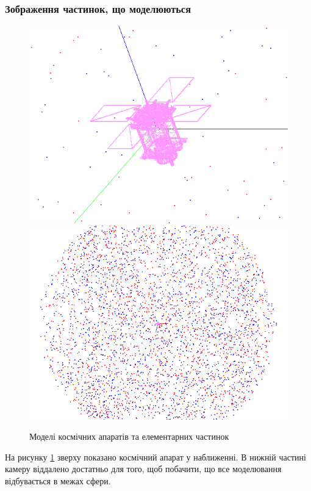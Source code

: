 \documentclass[a4paper,12pt]{article}
\begin{document}
\newpage
\subsubsection{Зображення частинок, що моделюються}

\begin{figure}[!htp]
\centering
\includegraphics[scale=0.7]{screens/screenshot3.png}
\includegraphics[scale=0.7]{screens/screenshot4.png}
\caption{Моделі космічних апаратів та елементарних частинок}
\label{fig:f2}
\end{figure}
\newpage

На рисунку \ref{fig:f2} зверху показано космічний апарат у наближенні. В нижній частині камеру віддалено достатньо для того, щоб побачити, що все моделювання відбувається в межах сфери.
\end{document}
